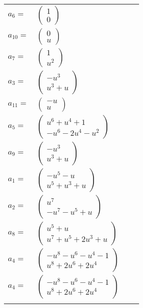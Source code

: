 \documentclass[1p]{elsarticle_modified}
\theoremstyle{definition}
\begin{document}
\begin{tabular}{m{7pt} m{180pt} m{7pt} m{180pt} }
\flushright $a_{6}=$&$\begin{pmatrix}1\\0\end{pmatrix}$ \\
\flushright $a_{10}=$&$\begin{pmatrix}0\\u\end{pmatrix}$ \\
\flushright $a_{7}=$&$\begin{pmatrix}1\\u^2\end{pmatrix}$ \\
\flushright $a_{3}=$&$\begin{pmatrix}- u^3\\u^3+u\end{pmatrix}$ \\
\flushright $a_{11}=$&$\begin{pmatrix}- u\\u\end{pmatrix}$ \\
\flushright $a_{5}=$&$\begin{pmatrix}u^6+u^4+1\\- u^6-2 u^4- u^2\end{pmatrix}$ \\
\flushright $a_{9}=$&$\begin{pmatrix}- u^3\\u^3+u\end{pmatrix}$ \\
\flushright $a_{1}=$&$\begin{pmatrix}- u^5- u\\u^5+u^3+u\end{pmatrix}$ \\
\flushright $a_{2}=$&$\begin{pmatrix}u^7\\- u^7- u^5+u\end{pmatrix}$ \\
\flushright $a_{8}=$&$\begin{pmatrix}u^5+u\\u^7+u^5+2 u^3+u\end{pmatrix}$ \\
\flushright $a_{4}=$&$\begin{pmatrix}- u^8- u^6- u^4-1\\u^8+2 u^6+2 u^4\end{pmatrix}$\\ \flushright $a_{4}=$&$\begin{pmatrix}- u^8- u^6- u^4-1\\u^8+2 u^6+2 u^4\end{pmatrix}$\\&\end{tabular}
\end{document}
